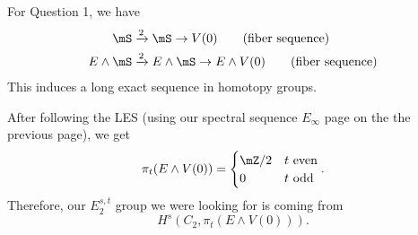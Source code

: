 For Question 1, we have 
\begin{align*}
    \mS&\xr{2}\mS\to V(0)\tag{fiber sequence}\\
    E\wedge \mS&\xr{2}E\wedge \mS \to E\wedge V(0)\tag{fiber sequence}
\end{align*}
This induces a long exact sequence in homotopy groups. 
\begin{center}
\end{center}
After following the LES (using our spectral sequence $E_\infty$ page on the the previous page), we get $$\pi_t(E\wedge V(0)) = \begin{cases}
    \mZ/2 & t\text{ even}\\
    0 & t\text{ odd}
\end{cases}.$$
Therefore, our $E_2^{s,t}$ group we were looking for is coming from $$H^s(C_2,\pi_t(E\wedge V(0))).$$

\begin{center}
  \end{center}